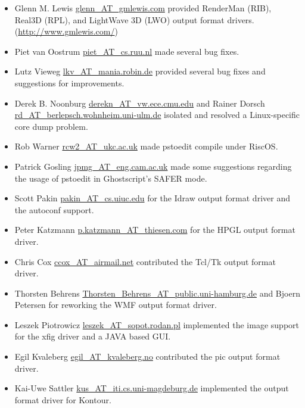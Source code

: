 \documentclass[english,a4paper]{article}
\let\URL\url \let\Email\url \let\File\url
\begin{document}
\begin{itemize}
  \item Glenn M. Lewis \Email{glenn_AT_gmlewis.com} provided RenderMan (RIB),
     Real3D (RPL), and LightWave 3D (LWO) output format drivers.
     (\URL{http://www.gmlewis.com/})

  \item Piet van Oostrum \Email{piet_AT_cs.ruu.nl} made several bug fixes.
  
  \item Lutz Vieweg \Email{lkv_AT_mania.robin.de} provided several bug fixes and
     suggestions for improvements.
     
  \item Derek B. Noonburg \Email{derekn_AT_vw.ece.cmu.edu} and Rainer Dorsch
     \Email{rd_AT_berlepsch.wohnheim.uni-ulm.de} isolated and resolved a
     Linux-specific core dump problem.

  \item Rob Warner \Email{rcw2_AT_ukc.ac.uk} made pstoedit compile under RiscOS.
  
  \item Patrick Gosling \Email{jpmg_AT_eng.cam.ac.uk} made some suggestions
     regarding the usage of pstoedit in Ghostscript's SAFER mode.

  \item Scott Pakin \Email{pakin_AT_cs.uiuc.edu} for the Idraw output format driver and the 
	autoconf support.

  \item Peter Katzmann \Email{p.katzmann_AT_thiesen.com} for the HPGL output format driver.
  
  \item Chris Cox \Email{ccox_AT_airmail.net} contributed the Tcl/Tk output format driver.
  
  \item Thorsten Behrens \Email{Thorsten_Behrens_AT_public.uni-hamburg.de} and
     Bjoern Petersen for reworking the WMF output format driver.

  \item Leszek Piotrowicz \Email{leszek_AT_sopot.rodan.pl} implemented the image
     support for the xfig driver and a JAVA based GUI.

  \item Egil Kvaleberg \Email{egil_AT_kvaleberg.no} contributed the pic output format driver.
  
  \item Kai-Uwe Sattler \Email{kus_AT_iti.cs.uni-magdeburg.de} implemented the
     output format driver for Kontour.


\end{itemize}
\end{document}
